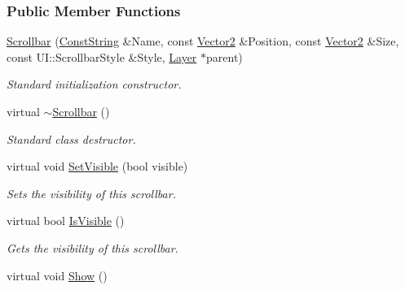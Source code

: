 \subsubsection*{Public Member Functions}
\begin{DoxyCompactItemize}
\item 
\hyperlink{classphys_1_1UI_1_1Scrollbar_a881584c25e2d1a29daeb324d4b8a017d}{Scrollbar} (\hyperlink{namespacephys_a5ce5049f8b4bf88d6413c47b504ebb31}{ConstString} \&Name, const \hyperlink{classphys_1_1Vector2}{Vector2} \&Position, const \hyperlink{classphys_1_1Vector2}{Vector2} \&Size, const UI::ScrollbarStyle \&Style, \hyperlink{classphys_1_1UI_1_1Layer}{Layer} $\ast$parent)
\begin{DoxyCompactList}\small\item\em Standard initialization constructor. \item\end{DoxyCompactList}\item 
\hypertarget{classphys_1_1UI_1_1Scrollbar_af9fb189c7856353a930c0a228fc0cf42}{
virtual \hyperlink{classphys_1_1UI_1_1Scrollbar_af9fb189c7856353a930c0a228fc0cf42}{$\sim$Scrollbar} ()}
\label{d0/d3e/classphys_1_1UI_1_1Scrollbar_af9fb189c7856353a930c0a228fc0cf42}

\begin{DoxyCompactList}\small\item\em Standard class destructor. \item\end{DoxyCompactList}\item 
virtual void \hyperlink{classphys_1_1UI_1_1Scrollbar_a2d8997e0bbbb1c17af5128fea98fb1e4}{SetVisible} (bool visible)
\begin{DoxyCompactList}\small\item\em Sets the visibility of this scrollbar. \item\end{DoxyCompactList}\item 
virtual bool \hyperlink{classphys_1_1UI_1_1Scrollbar_a213c946ccadd3b689f59e2761a1d1848}{IsVisible} ()
\begin{DoxyCompactList}\small\item\em Gets the visibility of this scrollbar. \item\end{DoxyCompactList}\item 
\hypertarget{classphys_1_1UI_1_1Scrollbar_a42955ae0e2b273ca9ea392a8dbc62604}{
virtual void \hyperlink{classphys_1_1UI_1_1Scrollbar_a42955ae0e2b273ca9ea392a8dbc62604}{Show} ()}
\label{d0/d3e/classphys_1_1UI_1_1Scrollbar_a42955ae0e2b273ca9ea392a8dbc62604}


\end{DoxyCompactItemize}
